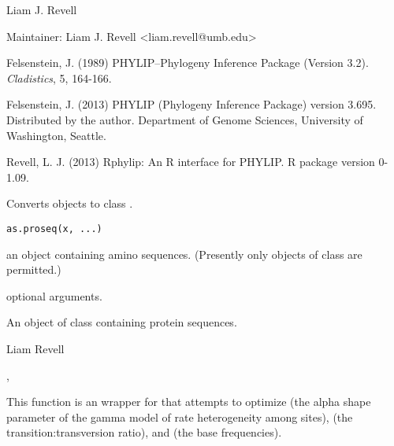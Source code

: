 \documentclass[a4paper]{book}
\begin{document}
%
\begin{Author}\relax
Liam J. Revell

Maintainer: Liam J. Revell <liam.revell@umb.edu>
\end{Author}
%
\begin{References}\relax
Felsenstein, J. (1989) PHYLIP--Phylogeny Inference Package (Version 3.2). \emph{Cladistics}, 5, 164-166.

Felsenstein, J. (2013) PHYLIP (Phylogeny Inference Package) version 3.695. Distributed by the author. Department of Genome Sciences, University of Washington, Seattle.

Revell, L. J. (2013) Rphylip: An R interface for PHYLIP. R package version 0-1.09.
\end{References}
%
\begin{Description}\relax
Converts objects to class .
\end{Description}
%
\begin{Usage}
\begin{verbatim}
as.proseq(x, ...)
\end{verbatim}
\end{Usage}
%
\begin{Arguments}
\begin{ldescription}
\item[\code{x}] an object containing amino sequences. (Presently only objects of class  are permitted.)
\item[\code{...}] optional arguments.
\end{ldescription}
\end{Arguments}
%
\begin{Value}
An object of class  containing protein sequences.
\end{Value}
%
\begin{Author}\relax
Liam Revell 
\end{Author}
%
\begin{SeeAlso}\relax
{}, 
\end{SeeAlso}
%
\begin{Description}\relax
This function is an wrapper for  that attempts to optimize  (the alpha shape parameter of the gamma model of rate heterogeneity among sites),  (the transition:transversion ratio), and  (the base frequencies).
\end{Description}
\end{document}
